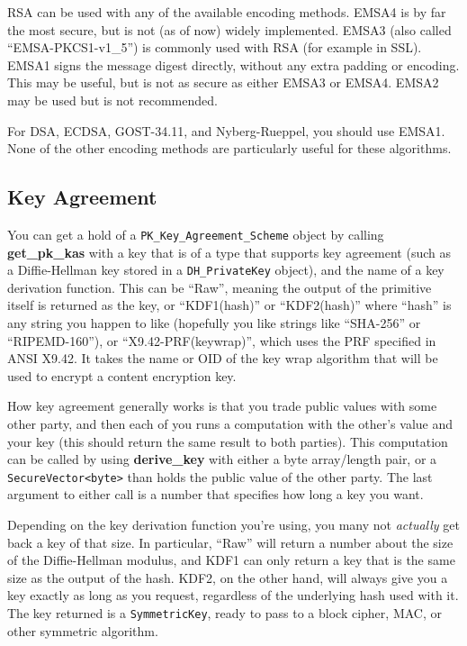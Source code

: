 \documentclass{article}
\newcommand{\function}[1]{\textbf{#1}}
\newcommand{\type}[1]{\texttt{#1}}
\begin{document}
RSA can be used with any of the available encoding methods. EMSA4 is
by far the most secure, but is not (as of now) widely
implemented. EMSA3 (also called ``EMSA-PKCS1-v1\_5'') is commonly used
with RSA (for example in SSL). EMSA1 signs the message digest
directly, without any extra padding or encoding. This may be useful,
but is not as secure as either EMSA3 or EMSA4. EMSA2 may be used but
is not recommended.

For DSA, ECDSA, GOST-34.11, and Nyberg-Rueppel, you should use
EMSA1. None of the other encoding methods are particularly useful for
these algorithms.

\subsection{Key Agreement}

You can get a hold of a \type{PK\_Key\_Agreement\_Scheme} object by
calling \function{get\_pk\_kas} with a key that is of a type that
supports key agreement (such as a Diffie-Hellman key stored in a
\type{DH\_PrivateKey} object), and the name of a key derivation
function. This can be ``Raw'', meaning the output of the primitive
itself is returned as the key, or ``KDF1(hash)'' or ``KDF2(hash)''
where ``hash'' is any string you happen to like (hopefully you like
strings like ``SHA-256'' or ``RIPEMD-160''), or
``X9.42-PRF(keywrap)'', which uses the PRF specified in ANSI X9.42. It
takes the name or OID of the key wrap algorithm that will be used to
encrypt a content encryption key.

How key agreement generally works is that you trade public values with some
other party, and then each of you runs a computation with the other's value and
your key (this should return the same result to both parties). This computation
can be called by using \function{derive\_key} with either a byte array/length
pair, or a \type{SecureVector<byte>} than holds the public value of the other
party. The last argument to either call is a number that specifies how long a
key you want.

Depending on the key derivation function you're using, you many not
\emph{actually} get back a key of that size. In particular, ``Raw'' will return
a number about the size of the Diffie-Hellman modulus, and KDF1 can only return
a key that is the same size as the output of the hash. KDF2, on the other
hand, will always give you a key exactly as long as you request, regardless of
the underlying hash used with it. The key returned is a \type{SymmetricKey},
ready to pass to a block cipher, MAC, or other symmetric algorithm.
\end{document}
